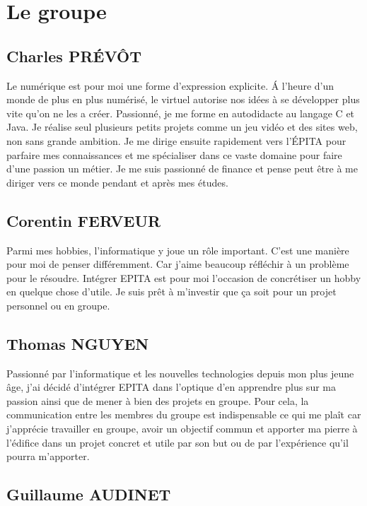 \documentclass[a4paper,12pt]{article}
\begin{document}
\newpage

\section {Le groupe}

\subsection{Charles PRÉVÔT}

Le numérique est pour moi une forme d'expression explicite. Á l'heure d'un monde de plus en plus numérisé, le virtuel autorise nos idées à se développer plus vite qu'on ne les a créer. Passionné, je me forme en autodidacte au langage C et Java. Je réalise seul plusieurs petits projets comme un jeu vidéo et des sites web, non sans grande ambition. Je me dirige ensuite rapidement vers l'ÉPITA pour parfaire mes connaissances et me spécialiser dans ce vaste domaine pour faire d'une passion un métier. Je me suis passionné de finance et pense peut être à me diriger vers ce monde pendant et après mes études.


\subsection{Corentin FERVEUR}

Parmi mes hobbies, l'informatique y joue un rôle important. C'est une manière pour moi de penser différemment. Car j'aime beaucoup réfléchir à un problème pour le résoudre. Intégrer EPITA est pour moi l'occasion de concrétiser un hobby en quelque chose d'utile. Je suis prêt à m'investir que ça soit pour un projet personnel ou en groupe.

\newpage

\subsection{Thomas NGUYEN}

Passionné par l'informatique et les nouvelles technologies depuis mon plus jeune âge, j'ai décidé d'intégrer EPITA dans l'optique d'en apprendre plus sur ma passion ainsi que de mener à bien des projets en groupe. Pour cela, la communication entre les membres du groupe est indispensable ce qui me plaît car j'apprécie travailler en groupe, avoir un objectif commun et apporter ma pierre à l'édifice dans un projet concret et utile par son but ou de par l'expérience qu'il pourra m'apporter.

\subsection{Guillaume AUDINET}
\end{document}
